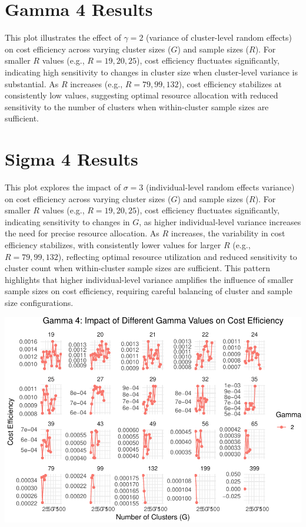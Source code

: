 \documentclass[
]{article}
\begin{document}
\hypertarget{gamma-4-results}{%
\section{Gamma 4 Results}\label{gamma-4-results}}

This plot illustrates the effect of \(\gamma = 2\) (variance of
cluster-level random effects) on cost efficiency across varying cluster
sizes (\(G\)) and sample sizes (\(R\)). For smaller \(R\) values (e.g.,
\(R = 19, 20, 25\)), cost efficiency fluctuates significantly,
indicating high sensitivity to changes in cluster size when
cluster-level variance is substantial. As \(R\) increases (e.g.,
\(R = 79, 99, 132\)), cost efficiency stabilizes at consistently low
values, suggesting optimal resource allocation with reduced sensitivity
to the number of clusters when within-cluster sample sizes are
sufficient.

\hypertarget{sigma-4-results}{%
\section{Sigma 4 Results}\label{sigma-4-results}}

This plot explores the impact of \(\sigma = 3\) (individual-level random
effects variance) on cost efficiency across varying cluster sizes
(\(G\)) and sample sizes (\(R\)). For smaller \(R\) values (e.g.,
\(R = 19, 20, 25\)), cost efficiency fluctuates significantly,
indicating sensitivity to changes in \(G\), as higher individual-level
variance increases the need for precise resource allocation. As \(R\)
increases, the variability in cost efficiency stabilizes, with
consistently lower values for larger \(R\) (e.g., \(R = 79, 99, 132\)),
reflecting optimal resource utilization and reduced sensitivity to
cluster count when within-cluster sample sizes are sufficient. This
pattern highlights that higher individual-level variance amplifies the
influence of smaller sample sizes on cost efficiency, requiring careful
balancing of cluster and sample size configurations.

\begin{center}\includegraphics{Project3Simulation_files/figure-latex/unnamed-chunk-12-1} \end{center}
\end{document}
